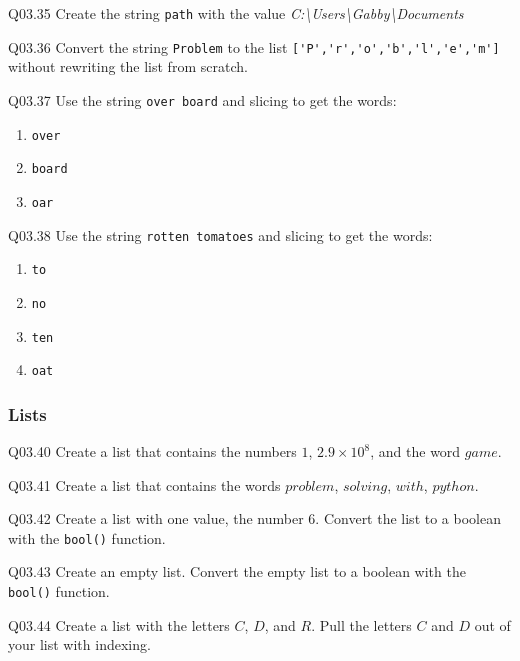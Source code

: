 \documentclass{book}
\newcommand{\passthrough}[1]{#1}
\begin{document}
Q03.35 Create the string \passthrough{\lstinline!path!} with the value
\emph{C:\textbackslash{}Users\textbackslash{}Gabby\textbackslash{}Documents}

Q03.36 Convert the string \passthrough{\lstinline!Problem!} to the list
\passthrough{\lstinline!['P','r','o','b','l','e','m']!} without
rewriting the list from scratch.

Q03.37 Use the string \passthrough{\lstinline!over board!} and slicing
to get the words:

\begin{enumerate}
\def\labelenumi{(\alph{enumi})}
\item
  \passthrough{\lstinline!over!}
\item
  \passthrough{\lstinline!board!}
\item
  \passthrough{\lstinline!oar!}
\end{enumerate}

Q03.38 Use the string \passthrough{\lstinline!rotten tomatoes!} and
slicing to get the words:

\begin{enumerate}
\def\labelenumi{(\alph{enumi})}
\item
  \passthrough{\lstinline!to!}
\item
  \passthrough{\lstinline!no!}
\item
  \passthrough{\lstinline!ten!}
\item
  \passthrough{\lstinline!oat!}
\end{enumerate}
    




    
        \hypertarget{lists}{%
\subsubsection{Lists}\label{lists}}

Q03.40 Create a list that contains the numbers \(1\),
\(2.9 \times 10^8\), and the word \(game\).

Q03.41 Create a list that contains the words \(problem\), \(solving\),
\(with\), \(python\).

Q03.42 Create a list with one value, the number \(6\). Convert the list
to a boolean with the \passthrough{\lstinline!bool()!} function.

Q03.43 Create an empty list. Convert the empty list to a boolean with
the \passthrough{\lstinline!bool()!} function.

Q03.44 Create a list with the letters \(C\), \(D\), and \(R\). Pull the
letters \(C\) and \(D\) out of your list with indexing.
\end{document}

